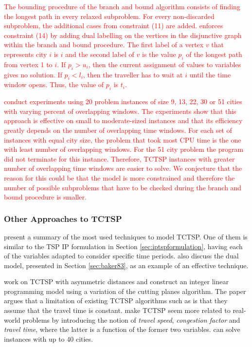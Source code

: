 \documentclass{mprop}
\theoremstyle{definition}
\begin{document}
\textcolor{red}{
The bounding procedure of the branch and bound algorithm consists of finding the longest path in every relaxed subproblem. For every non-discarded subproblem, the additional cases from constraint (11) are added.
\citet{Baker83} enforces constraint (14) by adding dual labelling on the vertices in the disjunctive graph within the branch and bound procedure. The first label of a vertex $v$ that represents city $i$ is $i$ and the second label of 
$v$ is the value $p_{i}$ of the longest path from vertex 1 to $i$. If $p_{i} > u_{i}$, then the current assignment of values to variables gives no solution. If $p_{i} < l_{i}$, then the traveller has to wait at $i$ until the time window opens. Thus, the value of $p_{i}$ is $t_{i}$.}

\textcolor{red}{\citet{Baker83} conduct experiments using 20 problem instances of size 9, 13, 22, 30 or 51 cities with varying percent of overlapping windows.
The experiments show that this approach is effective on small to moderate-sized instances and that its efficiency greatly depends on the number of overlapping time windows. For each set of instances with equal city size, the problem that took most CPU time is the one with least number of overlapping windows. For the 51 city problem the program did not terminate for this instance.
Therefore, TCTSP instances with greater number of overlapping time windows are easier to solve. We conjecture that the reason for this could be that the model is more constrained and therefore the number of possible subproblems that have to be checked during the branch and bound procedure is smaller.}

\subsubsection{Other Approaches to TCTSP}
\label{sec:tctspmain}

\citet{tspbible} present a summary of the most used techniques to model TCTSP. One of them is similar to the TSP IP formulation in Section \ref{sec:iptspformulation}, having each of the variables adapted to consider specific time periods. \citet{tspbible} also discuss the dual model, presented in Section \ref{sec:baker83}, as an example of an effective technique.

\citet{ariglianotime} work on TCTSP with asymmetric distances 
and construct an integer linear programming model using a variation of the cutting planes algorithm. The paper argues that a limitation of existing TCTSP algorithms such as \citep{Baker83} is that they assume that the travel time is constant. \citet{ariglianotime} make TCTSP seem more related to real-world problems by introducing the notion of \textit{travel speed}, \textit{congestion factor} and \textit{travel time}, where the latter is a function of the former two variables. \citet{ariglianotime} can solve instances with up to 40 cities.
\end{document}
